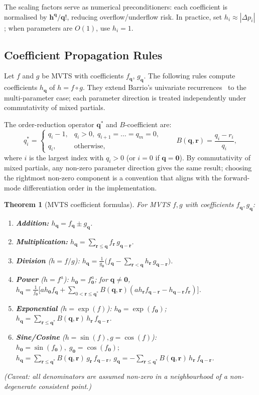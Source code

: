 \documentclass[12pt,a4paper]{article}
\theoremstyle{definition}
\theoremstyle{plain}
\newtheorem{theorem}{Theorem}[section]
\theoremstyle{remark}
\newcommand{\vq}{\mathbf{q}}
\newcommand{\vr}{\mathbf{r}}
\newcommand{\vh}{\mathbf{h}}
\newcommand{\vz}{\mathbf{0}}
\begin{document}
The scaling factors serve as numerical preconditioners: each coefficient is normalised by $\vh^{\vq}/\vq!$, reducing overflow/underflow risk. In practice, set $h_i \approx |\Delta p_i|$; when parameters are $O(1)$, use $h_i=1$.

\subsection{Coefficient Propagation Rules}

Let $f$ and $g$ be MVTS with coefficients $f_\vq$, $g_\vq$. The following rules compute coefficients $h_\vq$ of $h = f \circ g$. They extend Barrio's univariate recurrences~\cite{barrio2006sensitivity} to the multi-parameter case; each parameter direction is treated independently under commutativity of mixed partials.

The order-reduction operator $\vq^*$ and $B$-coefficient are:
\begin{equation*}
  q_i^* = \begin{cases}
    q_i-1, & q_i>0,\; q_{i+1}=\dots=q_m=0,\\
    q_i,   & \text{otherwise},
  \end{cases}
  \qquad
  B(\vq,\vr) = \frac{q_i-r_i}{q_i},
\end{equation*}
where $i$ is the largest index with $q_i>0$ (or $i=0$ if $\vq=\vz$). By commutativity of mixed partials, any non-zero parameter direction gives the same result; choosing the rightmost non-zero component is a convention that aligns with the forward-mode differentiation order in the implementation.

\begin{theorem}[MVTS coefficient formulas]\label{thm:coefficients}
For MVTS $f,g$ with coefficients $f_\vq,g_\vq$:
\begin{enumerate}[nosep]
  \item \textbf{Addition:} $h_\vq = f_\vq \pm g_\vq$.
  \item \textbf{Multiplication:} $h_\vq = \sum_{\vr\le\vq} f_\vr\,g_{\vq-\vr}$.
  \item \textbf{Division} ($h=f/g$): $h_\vq = \frac{1}{g_{\vz}}\bigl(f_\vq - \sum_{\vr<\vq} h_\vr\,g_{\vq-\vr}\bigr)$.
  \item \textbf{Power} ($h=f^a$): $h_{\vz}=f_{\vz}^a$; for $\vq\neq\vz$, $h_\vq = \frac{1}{f_{\vz}}\bigl[a h_{\vz}f_\vq + \sum_{0<\vr\le\vq^*} B(\vq,\vr)(a h_\vr f_{\vq-\vr} - h_{\vq-\vr}f_\vr)\bigr]$.
  \item \textbf{Exponential} ($h=\exp(f)$): $h_{\vz}=\exp(f_{\vz})$; $h_\vq = \sum_{\vr\le\vq^*} B(\vq,\vr)\,h_\vr\,f_{\vq-\vr}$.
  \item \textbf{Sine/Cosine} ($h=\sin(f),g=\cos(f)$):\begin{math} h_{\vz}=\sin(f_{\vz}),\; g_{\vz}=\cos(f_{\vz});\end{math}\\[2pt]
        $h_\vq = \sum_{\vr\le\vq^*} B(\vq,\vr)\,g_\vr\,f_{\vq-\vr}$,\; $g_\vq = -\sum_{\vr\le\vq^*} B(\vq,\vr)\,h_\vr\,f_{\vq-\vr}$.
\end{enumerate}
(Caveat: all denominators are assumed non-zero in a neighbourhood of a non-degenerate consistent point.)
\end{theorem}
\end{document}
